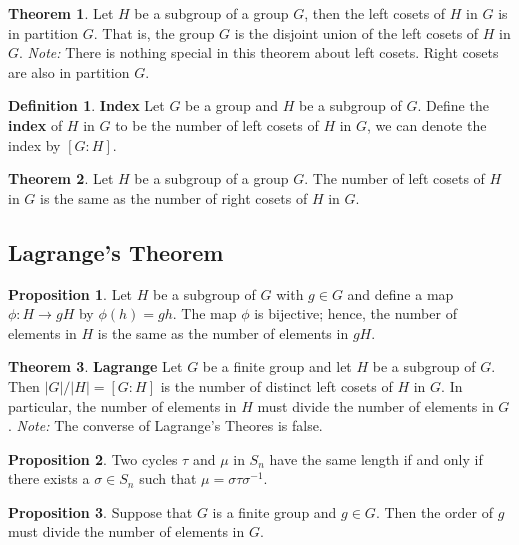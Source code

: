 \documentclass{article}
\theoremstyle{definition}
\newtheorem{defi}{Definition}[subsection]
\newtheorem{theorem}{Theorem}[subsection]
\newtheorem{prop}{Proposition}[subsection]
\begin{document}
\begin{theorem}
Let $H$ be a subgroup of a group $G$, then the left cosets of $H$ in $G$ is in partition $G$. That is, the group $G$ is the disjoint union of the left cosets of $H$ in $G$.
\textit{Note:} There is nothing special in this theorem about left cosets. Right cosets are also in partition $G$.
\end{theorem}

\begin{defi}
\textbf{Index} Let $G$ be a group and $H$ be a subgroup of $G$. Define the \textbf{index} of $H$ in $G$ to be the number of left cosets of $H$ in $G$, we can denote the index by $[G:H]$.
\end{defi}

\begin{theorem}
Let $H$ be a subgroup of a group $G$. The number of left cosets of $H$ in $G$ is the same as the number of right cosets of $H$ in $G$.
\end{theorem}

\subsection{Lagrange's Theorem}

\begin{prop}
Let $H$ be a subgroup of $G$ with $g\in G$ and define a map $\phi: H\to gH$ by $\phi(h)=gh$. The map $\phi$ is bijective; hence, the number of elements in $H$ is the same as the number of elements in $gH$.
\end{prop}

\begin{theorem}
\textbf{Lagrange} Let $G$ be a finite group and let $H$ be a subgroup of $G$. Then $|G|/|H| = [G:H]$ is the number of distinct left cosets of $H$ in $G$. In particular, the number of elements in $H$ must divide the number of elements in $G$. 
\textit{Note: } The converse of Lagrange's Theores is false.
\end{theorem}

\begin{prop}
Two cycles $\tau$ and $\mu$ in $S_n$ have the same length if and only if there exists a $\sigma\in S_n$ such that $\mu=\sigma\tau\sigma^{-1}$.
\end{prop}

\begin{prop}
Suppose that $G$ is a finite group and $g\in G$. Then the order of $g$ must divide the number of elements in $G$.
\end{prop}
\end{document}
